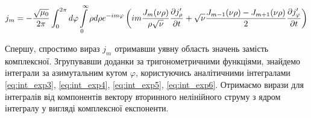 \begin{equation*} \begin{aligned}
j_m = - \frac{\sqrt{\mu_0}}{2\pi} 
\int_{0}^{2\pi} d \varphi \int \limits_{0}^{\infty} \rho d \rho
e^{-im\varphi} \left( i  m \frac{J_m (\nu \rho)}{\rho \sqrt{\nu}}
\frac{\partial j_\rho^\prime}{\partial t} + \sqrt{\nu}
\frac{J_{m-1} (\nu \rho) - J_{m+1} (\nu \rho)}{2}
\frac{\partial j_\varphi^\prime}{\partial t} \right)
\end{aligned} \end{equation*}

Спершу, спростимо вираз $ j_m $ отримавши уявну область 
значень замість комплексної. Згрупувавши доданки за тригонометричними 
функціями, знайдемо інтеграли за азимутальним кутом $ \varphi $, 
користуючись аналітичними інтегралами \eqref{eq:int_exp3}, 
\eqref{eq:int_exp4}, \eqref{eq:int_exp5}, \eqref{eq:int_exp6}. Отримаємо 
вирази для інтегралів від компонентів вектору вторинного нелінійного струму 
з ядром інтегралу у вигляді комплексної експоненти.

%
%

